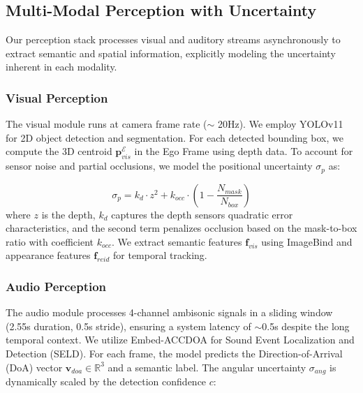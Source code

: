 \subsection{Multi-Modal Perception with
    Uncertainty}\label{multi-modal-perception-with-uncertainty}

Our perception stack processes visual and auditory streams
asynchronously to extract semantic and spatial information, explicitly
modeling the uncertainty inherent in each modality.

\subsubsection{Visual Perception}\label{visual-perception}

The visual module runs at camera frame rate (\(\sim\) 20Hz). We employ
YOLOv11 \cite{YOLOv11OverviewKey2024} for 2D object detection and
segmentation. For each detected bounding box, we compute the 3D centroid
\(\mathbf{p}_{vis}^{\mathcal{E}}\) in the Ego Frame using depth data.
To account for sensor noise and partial occlusions, we model the
positional uncertainty \(\sigma_{p}\) as:

\begin{equation}
    \sigma_{p} = k_d \cdot z^2 + k_{occ} \cdot \left(1 - \frac{N_{mask}}{N_{box}}\right)
    \label{eq:positional-uncertainty}
\end{equation}
where \(z\) is the depth, \(k_d\) captures the depth
sensor\textquotesingle s quadratic error characteristics, and the second
term penalizes occlusion based on the mask-to-box ratio with coefficient
\(k_{occ}\). We extract semantic features \(\mathbf{f}_{vis}\) using
ImageBind \cite{ImageBindOneEmbedding2023} and appearance features
\(\mathbf{f}_{reid}\) for temporal tracking.

\subsubsection{Audio Perception}\label{audio-perception}

The audio module processes 4-channel ambisonic signals in a sliding
window (2.55s duration, 0.5s stride), ensuring a system latency of \(\sim\)0.5s despite the long temporal context. We utilize Embed-ACCDOA
\cite{OpenvocabularySoundEvent2025} for Sound Event Localization and
Detection (SELD).
For each frame, the model predicts the Direction-of-Arrival (DoA) vector
\(\mathbf{v}_{doa} \in \mathbb{R}^3\) and a semantic label. The angular
uncertainty \(\sigma_{ang}\) is dynamically scaled by the detection
confidence \(c\):

